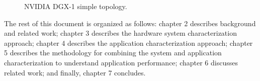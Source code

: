 \begin{figure}
    \centering
    \caption{NVIDIA DGX-1 simple topology.}
    \label{fig:topo-dgx-simple}
\end{figure}




The rest of this document is organized as follows:
chapter 2 describes background and related work;
chapter 3 describes the hardware system characterization approach;
chapter 4 describes the application characterization approach;
chapter 5 describes the methodology for combining the system and application characterization to understand application performance;
chapter 6 discusses related work;
and finally, chapter 7 concludes.
